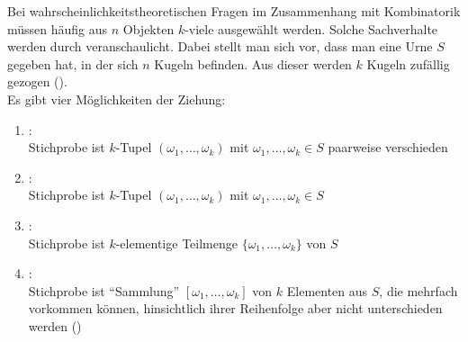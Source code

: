 \linie
\pagebreak

\begin{Bem}
    Bei wahrscheinlichkeitstheoretischen Fragen im Zusammenhang mit Kombinatorik müssen häufig
    aus $n$ Objekten $k$-viele ausgewählt werden.
    Solche Sachverhalte werden durch  veranschaulicht.
    Dabei stellt man sich vor, dass man eine Urne $S$ gegeben hat, in der sich $n$ Kugeln befinden.
    Aus dieser werden $k$ Kugeln zufällig gezogen ().\\
    Es gibt vier Möglichkeiten der Ziehung:
    \begin{enumerate}
        \item
        :\\
        Stichprobe ist $k$-Tupel $(\omega_1, \dotsc, \omega_k)$ mit
        $\omega_1, \dotsc, \omega_k \in S$ paarweise verschieden
        
        \item
        :\\
        Stichprobe ist $k$-Tupel $(\omega_1, \dotsc, \omega_k)$ mit
        $\omega_1, \dotsc, \omega_k \in S$
        
        \item
        :\\
        Stichprobe ist $k$-elementige Teilmenge $\{\omega_1, \dotsc, \omega_k\}$ von $S$
        
        \item
        :\\
        Stichprobe ist "`Sammlung"' $[\omega_1, \dotsc, \omega_k]$ von $k$ Elementen aus $S$,
        die mehrfach vorkommen können, hinsichtlich ihrer Reihenfolge aber nicht unterschieden
        werden ()
    \end{enumerate}
\end{Bem}

